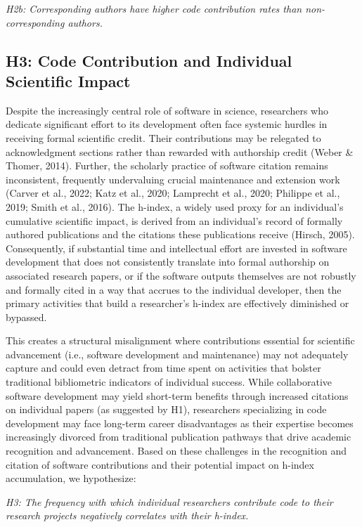 \documentclass[
  number,
  3p,
  onecolumn]{elsarticle}
\begin{document}
\emph{H2b: Corresponding authors have higher code contribution rates
than non-corresponding authors.}

\subsection{H3: Code Contribution and Individual Scientific
Impact}\label{h3-code-contribution-and-individual-scientific-impact}

Despite the increasingly central role of software in science,
researchers who dedicate significant effort to its development often
face systemic hurdles in receiving formal scientific credit. Their
contributions may be relegated to acknowledgment sections rather than
rewarded with authorship credit (Weber \& Thomer, 2014). Further, the
scholarly practice of software citation remains inconsistent, frequently
undervaluing crucial maintenance and extension work (Carver et al.,
2022; Katz et al., 2020; Lamprecht et al., 2020; Philippe et al., 2019;
Smith et al., 2016). The h-index, a widely used proxy for an
individual's cumulative scientific impact, is derived from an
individual's record of formally authored publications and the citations
these publications receive (Hirsch, 2005). Consequently, if substantial
time and intellectual effort are invested in software development that
does not consistently translate into formal authorship on associated
research papers, or if the software outputs themselves are not robustly
and formally cited in a way that accrues to the individual developer,
then the primary activities that build a researcher's h-index are
effectively diminished or bypassed.

This creates a structural misalignment where contributions essential for
scientific advancement (i.e., software development and maintenance) may
not adequately capture and could even detract from time spent on
activities that bolster traditional bibliometric indicators of
individual success. While collaborative software development may yield
short-term benefits through increased citations on individual papers (as
suggested by H1), researchers specializing in code development may face
long-term career disadvantages as their expertise becomes increasingly
divorced from traditional publication pathways that drive academic
recognition and advancement. Based on these challenges in the
recognition and citation of software contributions and their potential
impact on h-index accumulation, we hypothesize:

\emph{H3: The frequency with which individual researchers contribute
code to their research projects negatively correlates with their
h-index.}
\end{document}
